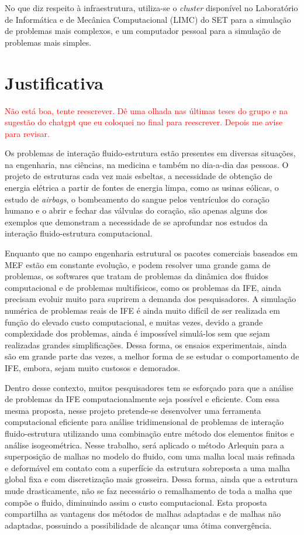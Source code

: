 \documentclass[tese_patricia.tex]{subfiles}
\begin{document}
No que diz respeito à infraestrutura, utiliza-se o \textit{cluster} disponível no Laboratório de Informática e de Mecânica Computacional (LIMC) do SET para a simulação de problemas mais complexos, e um computador pessoal para a simulação de problemas mais simples.


 \section[Justificativa]{Justificativa}

 \textcolor{red}{Não está boa, tente reescrever. Dê uma olhada nas últimas teses do grupo e na sugestão do chatgpt que eu coloquei no final para reescrever. Depois me avise para revisar.}

Os problemas de interação fluido-estrutura estão presentes em diversas situações, na engenharia, nas ciências, na medicina e também no dia-a-dia das pessoas.
O projeto de estruturas cada vez mais esbeltas, a necessidade de obtenção de energia elétrica a partir de fontes de energia limpa, como as usinas eólicas, o estudo de \textit{airbags}, o bombeamento do sangue pelos ventrículos do coração humano e o abrir e fechar das válvulas do coração, são apenas alguns dos exemplos que demonstram a necessidade de se aprofundar nos estudos da interação fluido-estrutura computacional.

Enquanto que no campo engenharia estrutural os pacotes comerciais baseados em MEF estão em constante evolução, e podem resolver uma grande gama de problemas, os softwares que tratam de problemas da dinâmica dos fluidos computacional e de problemas multifísicos, como os problemas da IFE, ainda precisam evoluir muito para suprirem a demanda dos pesquisadores. A simulação numérica de problemas reais de IFE é ainda muito difícil de ser realizada em função do elevado custo computacional, e muitas vezes, devido a grande complexidade dos problemas, ainda é impossível simulá-los sem que sejam realizadas grandes simplificações. Dessa forma, os ensaios experimentais, ainda são em grande parte das vezes, a melhor forma de se estudar o comportamento de IFE, embora, sejam muito custosos e demorados.

Dentro desse contexto, muitos pesquisadores tem se esforçado para que a análise de problemas da IFE computacionalmente seja possível e eficiente. Com essa mesma proposta, nesse projeto pretende-se desenvolver uma ferramenta computacional eficiente para análise tridimensional de problemas de interação fluido-estrutura utilizando uma combinação entre método dos elementos finitos e análise isogeométrica.  Nesse trabalho, será aplicado o método Arlequin para a superposição de malhas no modelo do fluido, com uma malha local mais refinada e deformável em contato com a superfície da estrutura sobreposta a uma malha global fixa e com discretização mais grosseira. Dessa forma, ainda que a estrutura mude drasticamente, não se faz necessário o remalhamento de toda a malha que compõe o fluido, diminuindo assim o custo computacional. Esta proposta compartilha as vantagens dos métodos de malhas adaptadas e de malhas não adaptadas, possuindo a possibilidade de alcançar uma ótima convergência.
\end{document}
